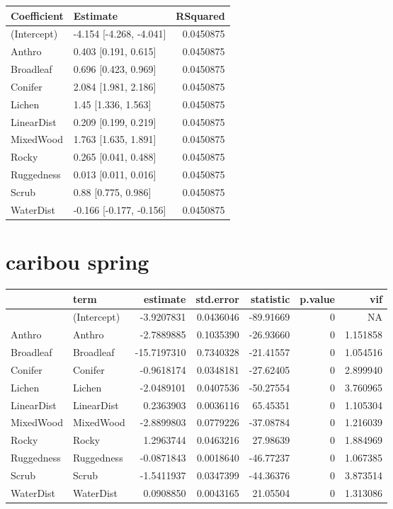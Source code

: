 \documentclass[]{article}
\begin{document}
\begin{tabular}{llr}
\toprule
Coefficient & Estimate & RSquared\\
\midrule
(Intercept) & -4.154 [-4.268, -4.041] & 0.0450875\\
Anthro & 0.403 [0.191, 0.615] & 0.0450875\\
Broadleaf & 0.696 [0.423, 0.969] & 0.0450875\\
Conifer & 2.084 [1.981, 2.186] & 0.0450875\\
Lichen & 1.45 [1.336, 1.563] & 0.0450875\\
LinearDist & 0.209 [0.199, 0.219] & 0.0450875\\
MixedWood & 1.763 [1.635, 1.891] & 0.0450875\\
Rocky & 0.265 [0.041, 0.488] & 0.0450875\\
Ruggedness & 0.013 [0.011, 0.016] & 0.0450875\\
Scrub & 0.88 [0.775, 0.986] & 0.0450875\\
WaterDist & -0.166 [-0.177, -0.156] & 0.0450875\\
\bottomrule
\end{tabular}

\section{caribou spring}\label{caribou-spring}

\begin{tabular}{llrrrrr}
\toprule
  & term & estimate & std.error & statistic & p.value & vif\\
\midrule
 & (Intercept) & -3.9207831 & 0.0436046 & -89.91669 & 0 & NA\\
Anthro & Anthro & -2.7889885 & 0.1035390 & -26.93660 & 0 & 1.151858\\
Broadleaf & Broadleaf & -15.7197310 & 0.7340328 & -21.41557 & 0 & 1.054516\\
Conifer & Conifer & -0.9618174 & 0.0348181 & -27.62405 & 0 & 2.899940\\
Lichen & Lichen & -2.0489101 & 0.0407536 & -50.27554 & 0 & 3.760965\\
LinearDist & LinearDist & 0.2363903 & 0.0036116 & 65.45351 & 0 & 1.105304\\
MixedWood & MixedWood & -2.8899803 & 0.0779226 & -37.08784 & 0 & 1.216039\\
Rocky & Rocky & 1.2963744 & 0.0463216 & 27.98639 & 0 & 1.884969\\
Ruggedness & Ruggedness & -0.0871843 & 0.0018640 & -46.77237 & 0 & 1.067385\\
Scrub & Scrub & -1.5411937 & 0.0347399 & -44.36376 & 0 & 3.873514\\
WaterDist & WaterDist & 0.0908850 & 0.0043165 & 21.05504 & 0 & 1.313086\\
\bottomrule
\end{tabular}
\end{document}
